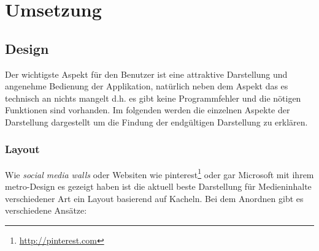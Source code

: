 \documentclass[12pt,twoside]{book}
\begin{document}
\chapter{Umsetzung}

\section*{Design}

Der wichtigste Aspekt für den Benutzer ist eine attraktive Darstellung und angenehme Bedienung der Applikation, natürlich neben dem Aspekt das es technisch an nichts mangelt d.h. es gibt keine Programmfehler und die nötigen Funktionen sind vorhanden. Im folgenden werden die einzelnen Aspekte der Darstellung dargestellt um die Findung der endgültigen Darstellung zu erklären.

\subsection*{Layout}

Wie \textit{social media walls} oder Websiten wie pinterest\footnote{\url{http://pinterest.com}} oder gar Microsoft mit ihrem metro-Design es gezeigt haben ist die aktuell beste Darstellung für Medieninhalte verschiedener Art ein Layout basierend auf Kacheln. Bei dem Anordnen gibt es verschiedene Ansätze:
\end{document}
